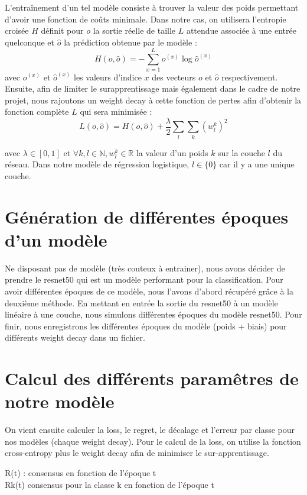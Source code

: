 \documentclass[12pt,english, openany]{book}
\begin{document}
L'entraînement d'un tel modèle consiste à trouver la valeur des poids permettant d'avoir une fonction de coûts minimale. Dans notre cas, on utilisera l'entropie croisée $H$ définit pour $o$ la sortie réelle de taille $L$ attendue associée à une entrée quelconque et $\hat{o}$ la prédiction obtenue par le modèle :
$$
H(o, \hat{o}) = - \sum_{x = 1}^{L} o^{(x)} \log \hat{o}^{(x)}
$$
avec $o^{(x)}$ et $\hat{o}^{(x)}$ les valeurs d'indice $x$ des vecteurs $o$ et $\hat{o}$ respectivement.\\

Ensuite, afin de limiter le surapprentissage mais également dans le cadre de notre projet, nous rajoutons un weight decay à cette fonction de pertes afin d'obtenir la fonction complète $L$ qui sera minimisée : 
$$
L(o, \hat{o}) = H(o, \hat{o}) + \frac{\lambda }{2}\sum_l\sum_k (w^k_l)^2
$$

avec $\lambda \in \left[0,1\right]$ et $\forall k,l \in \mathbb{N}, w^k_l \in \mathbb{R}$ la valeur d'un poids $k$ sur la couche $l$ du réseau. Dans notre modèle de régression logistique, $l \in \{0\}$ car il y a une unique couche. 
\section{Génération de différentes époques d'un modèle}

Ne disposant pas de modèle (très couteux à entrainer), nous avons décider de prendre le resnet50 qui est un modèle performant pour la classification. Pour avoir différentes époques de ce modèle, nous l'avons d'abord récupéré grâce à la deuxième méthode. En mettant en entrée la sortie du resnet50 à un modèle linéaire à une couche, nous simulons différentes époques du modèle resnet50. Pour finir, nous enregistrons les différentes époques du modèle (poids + biais) pour différents weight decay dans un fichier.

\section{Calcul des différents paramêtres de notre modèle}

On vient ensuite calculer la loss, le regret, le décalage et l'erreur par classe pour nos modèles (chaque weight decay).
Pour le calcul de la loss, on utilise la fonction cross-entropy plus le weight decay afin de minimiser le sur-apprentissage.

R(t) : consensus en fonction de l'époque t\\
Rk(t) consensus pour la classe k en fonction de l'époque t\\
\end{document}

